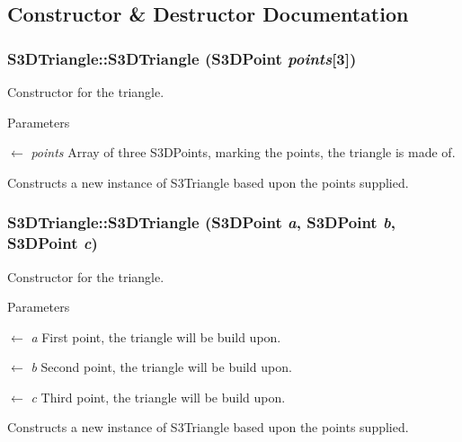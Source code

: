 \subsection{Constructor \& Destructor Documentation}
\hypertarget{class_s3_d_triangle_a2ac27d0814934c422e3fbf593c77014e}{
\subsubsection[{S3DTriangle}]{\setlength{\rightskip}{0pt plus 5cm}S3DTriangle::S3DTriangle ({\bf S3DPoint} {\em points}\mbox{[}3\mbox{]})}}
\label{class_s3_d_triangle_a2ac27d0814934c422e3fbf593c77014e}


Constructor for the triangle. 


\begin{DoxyParams}{Parameters}
\item[\mbox{$\leftarrow$} {\em points}]Array of three S3DPoints, marking the points, the triangle is made of.\end{DoxyParams}
Constructs a new instance of S3Triangle based upon the points supplied. \hypertarget{class_s3_d_triangle_a6709f19586226831dc2a50466e3e669e}{
\subsubsection[{S3DTriangle}]{\setlength{\rightskip}{0pt plus 5cm}S3DTriangle::S3DTriangle ({\bf S3DPoint} {\em a}, \/  {\bf S3DPoint} {\em b}, \/  {\bf S3DPoint} {\em c})}}
\label{class_s3_d_triangle_a6709f19586226831dc2a50466e3e669e}


Constructor for the triangle. 


\begin{DoxyParams}{Parameters}
\item[\mbox{$\leftarrow$} {\em a}]First point, the triangle will be build upon. \item[\mbox{$\leftarrow$} {\em b}]Second point, the triangle will be build upon. \item[\mbox{$\leftarrow$} {\em c}]Third point, the triangle will be build upon.\end{DoxyParams}
Constructs a new instance of S3Triangle based upon the points supplied. 

